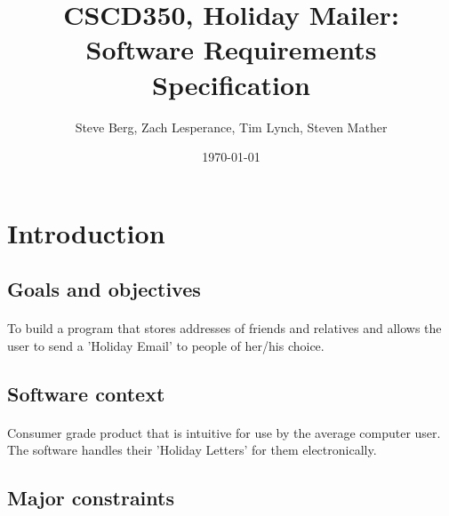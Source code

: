 \documentclass{article}
\title{CSCD350, Holiday Mailer: Software Requirements Specification}
\author{Steve Berg, Zach Lesperance, Tim Lynch, Steven Mather}
\date{\today}
\begin{document}
\maketitle{}
\pagebreak

\section{Introduction}

\subsection{Goals and objectives}
\paragraph{}
To build a program that stores addresses of friends and relatives and allows the user to send a 'Holiday Email' to people of her/his choice.


\subsection{Software context}
\paragraph{}
Consumer grade product that is intuitive for use by the average computer user. The software handles their 'Holiday Letters' for them electronically.

\subsection{Major constraints}
\end{document}
